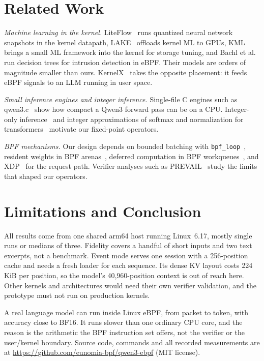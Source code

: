 \documentclass[sigconf,nonacm]{acmart}
\begin{document}
\section{Related Work}

\emph{Machine learning in the kernel.} LiteFlow~\cite{liteflow} runs
quantized neural network snapshots in the kernel datapath, LAKE~\cite{lake}
offloads kernel ML to GPUs, KML~\cite{kml} brings a small ML framework into
the kernel for storage tuning, and Bachl et al.~\cite{bachl} run decision
trees for intrusion detection in eBPF. Their models are orders of magnitude
smaller than ours. KernelX~\cite{kernelx} takes the opposite placement: it
feeds eBPF signals to an LLM running in user space.

\emph{Small inference engines and integer inference.} Single-file C engines
such as qwen3.c~\cite{qwen3c} show how compact a Qwen3 forward pass can be on
a CPU. Integer-only inference~\cite{jacob} and integer approximations of
softmax and normalization for transformers~\cite{ibert} motivate our
fixed-point operators.

\emph{BPF mechanisms.} Our design depends on bounded batching with
\texttt{bpf\_loop}~\cite{bpfloop}, resident weights in BPF
arenas~\cite{arena}, deferred computation in BPF workqueues~\cite{bpfwq}, and
XDP~\cite{xdp} for the request path. Verifier analyses such as
PREVAIL~\cite{prevail} study the limits that shaped our operators.

\section{Limitations and Conclusion}

All results come from one shared arm64 host running Linux~6.17, mostly single
runs or medians of three. Fidelity covers a handful of short inputs and two
text excerpts, not a benchmark. Event mode serves one session with a
256-position cache and needs a fresh loader for each sequence. Its dense KV
layout costs 224\,KiB per position, so the model's 40,960-position context
is out of reach here. Other kernels and architectures would need their own
verifier validation, and the prototype must not run on production kernels.

A real language model can run inside Linux eBPF, from packet to token, with
accuracy close to BF16. It runs slower than one ordinary CPU core, and the
reason is the arithmetic the BPF instruction set offers, not the verifier or
the user/kernel boundary. Source code, commands and all recorded
measurements are at \url{https://github.com/eunomia-bpf/qwen3-ebpf} (MIT
license).
\end{document}
